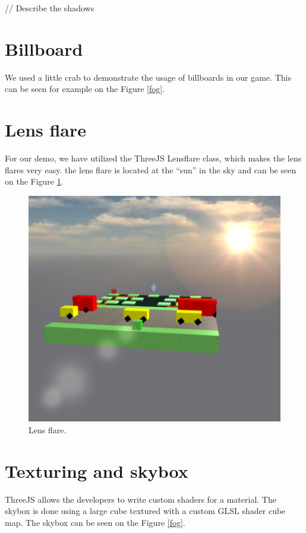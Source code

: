 \documentclass[a4paper,10pt, twocolumn]{article}
\begin{document}
// Describe the shadows

\section{Billboard}
We used a little crab to demonstrate the usage of billboards in our game. This can be seen for example on the Figure \ref{fog}.

\section{Lens flare}
For our demo, we have utilized the ThreeJS Lensflare class, which makes the lens flares very easy. the lens flare is located at the ``sun'' in the sky and can be seen on the Figure \ref{lensflare}.

\begin{figure}[!htb]
	\centering
	\includegraphics[width=\linewidth]{images/lensflare.png}
	\caption{Lens flare.}
	\label{lensflare}
\end{figure}

\section{Texturing and skybox}
ThreeJS allows the developers to write custom shaders for a material. The skybox is done using a large cube textured with a custom GLSL shader cube map. The skybox can be seen on the Figure \ref{fog}.
\end{document}
